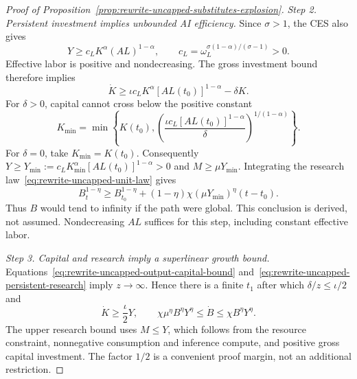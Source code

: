 \begin{proof}[Proof of Proposition~\ref{prop:rewrite-uncapped-substitutes-explosion}]
\textit{Step 2. Persistent investment implies unbounded AI efficiency.}
Since $\sigma>1$, the CES also gives
\[
 Y\geq c_LK^\alpha(AL)^{1-\alpha},\qquad
 c_L=\omega_L^{\sigma(1-\alpha)/(\sigma-1)}>0.
\]
Effective labor is positive and nondecreasing. The gross investment bound
therefore implies
\[
 \dot K\geq\iota c_LK^\alpha[AL(t_0)]^{1-\alpha}-\delta K.
\]
For $\delta>0$, capital cannot cross below the positive constant
\[
 K_{\min}=\min\left\{K(t_0),
 \left(\frac{\iota c_L[AL(t_0)]^{1-\alpha}}{\delta}
 \right)^{1/(1-\alpha)}\right\}.
\]
For $\delta=0$, take $K_{\min}=K(t_0)$. Consequently
$Y\geq Y_{\min}:=c_LK_{\min}^{\alpha}[AL(t_0)]^{1-\alpha}>0$
and $M\geq\mu Y_{\min}$. Integrating the research
law~\eqref{eq:rewrite-uncapped-unit-law} gives
\begin{equation}
 B_t^{1-\eta}\geq B_{t_0}^{1-\eta}
 +(1-\eta)\chi(\mu Y_{\min})^\eta(t-t_0).
 \label{eq:rewrite-uncapped-persistent-research}
\end{equation}
Thus $B$ would tend to infinity if the path were global. This conclusion
is derived, not assumed. Nondecreasing $AL$ suffices for this step,
including constant effective labor.

\textit{Step 3. Capital and research imply a superlinear growth bound.}
Equations~\eqref{eq:rewrite-uncapped-output-capital-bound}
and~\eqref{eq:rewrite-uncapped-persistent-research} imply $z\to\infty$.
Hence there is a finite $t_1$ after which $\delta/z\leq\iota/2$ and
\begin{equation}
 \dot K\geq\frac{\iota}{2}Y,\qquad
 \chi\mu^\eta B^\eta Y^\eta\leq\dot B\leq\chi B^\eta Y^\eta.
 \label{eq:rewrite-uncapped-stock-growth-bounds}
\end{equation}
The upper research bound uses $M\leq Y$, which follows from the resource
constraint, nonnegative consumption and inference compute, and positive
gross capital investment. The factor $1/2$ is a convenient proof margin,
not an additional restriction.


\end{proof}
